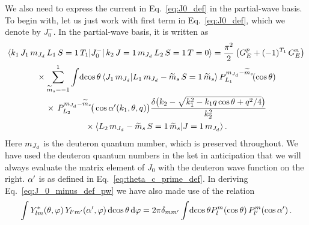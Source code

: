 	We also need to express the current in Eq.~\eqref{eq:J0_def} in the
	partial-wave basis.  To begin with, let us just work with first term in
	Eq.~\eqref{eq:J0_def}, which we denote by $J_0 ^-$.  In the partial-wave
	basis, it is written as
	\begin{multline}
	 \mbraket{k_1 \, J_1 \, \mJd \, L_1 \, S = 1 \, T_1}{J_0^{-}}
	 {\,k_2 \, J=1 \, \mJd \, L_2 \, S = 1 \, T = 0}
	 = \frac{\pi^2}{2} \, \big(G_E ^p + (-1)^{T_1} \, G_E^n\big) \\
	 \null \times \sum_{\widetilde{m}_s = -1}^1 \int\!\dcostheta
	 \, \braket{J_1 \, \mJd}{L_1 \, \mJd - \wt{m}_s \, S=1 \,\wt{m}_s}
	 \,P_{L_1}^{\mJd - \widetilde{m}_s}\!(\cos\theta) \\
	 \null \times
	 \,P_{L_2}^{\mJd - \widetilde{m}_s}\!\big(\cos\thetacprime(k_1, \theta, q)
	 \big) \frac{\delta\big(k_2-\sqrt{k_1^2-k_1 q \cos\theta + q^2/4}\big)}
	 {k_2^2} \\
	 \null \times
	 \CG{L_2}{\mJd - \widetilde{m}_s}{S = 1}{\widetilde{m}_s}{J = 1}{\mJd} \,.
	\label{eq:J_0_minus_def_pw}
	\end{multline}
	Here $m_{J_d}$ is the deuteron quantum number, which is preserved throughout.
	We have used the deuteron quantum numbers in the ket in anticipation
	that we will always evaluate the matrix element of $J_0$ with the deuteron
	wave function on the right.   $\alpha^\prime$ is as defined in
	Eq.~\eqref{eq:theta_c_prime_def}.  In deriving Eq.~\eqref{eq:J_0_minus_def_pw}
	we have also made use of the relation \cite{Jerry_thesis}
	\begin{equation}
	 \int Y_{lm} ^\ast(\theta, \varphi) \,
	 Y_{l^\prime m^\prime}(\alpha^\prime,\varphi)
	 \,\mathrm{d}\!\cos \theta \, \mathrm{d} \varphi
	 = 2\pi \delta_{m m^\prime}
	 \int\!\mathrm{d} \! \cos \theta
	 P_l^m(\cos\theta) \, P_{l^\prime}^m(\cos \alpha^\prime) \,.
	\end{equation}

